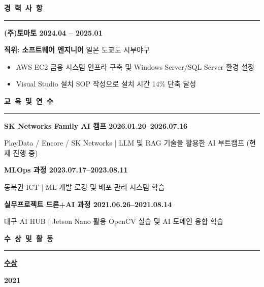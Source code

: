 \documentclass[a4paper, 10pt]{article}
\newcommand{\resumesection}[1]{%
  \vspace{8pt}
  \noindent
  {\large\bfseries #1}
  \vspace{2pt}
  \noindent\hrule
  \vspace{4pt}
}
\begin{document}

\resumesection{경\ 력\ 사\ 항}

\vspace{2pt}
\noindent
\textbf{(주)토마토 \hfill 2024.04 -- 2025.01}

\noindent
\textbf{\quad 직위: 소프트웨어 엔지니어} \hfill 일본 도쿄도 시부야구

\begin{itemize}
  \setlength{\itemsep}{1pt}
  \setlength{\parskip}{0pt}
  \item AWS EC2 금융 시스템 인프라 구축 및 Windows Server/SQL Server 환경 설정
  \item Visual Studio 설치 SOP 작성으로 설치 시간 14\% 단축 달성
\end{itemize}


\resumesection{교\ 육\ 및\ 연\ 수}

\vspace{2pt}
\noindent
\textbf{SK Networks Family AI 캠프 \hfill 2026.01.20--2026.07.16}

\noindent
{\small PlayData / Encore / SK Networks | LLM 및 RAG 기술을 활용한 AI 부트캠프 (현재 진행 중)}

\vspace{3pt}
\noindent
\textbf{MLOps 과정 \hfill 2023.07.17--2023.08.11}

\noindent
{\small 동북권 ICT | ML 개발 로깅 및 배포 관리 시스템 학습}

\vspace{3pt}
\noindent
\textbf{실무프로젝트 드론+AI 과정 \hfill 2021.06.26--2021.08.14}

\noindent
{\small 대구 AI HUB | Jetson Nano 활용 OpenCV 실습 및 AI 도메인 융합 학습}


\resumesection{수\ 상\ 및\ 활\ 동}

\vspace{2pt}
\noindent
\textbf{\underline{수상}}

\vspace{2pt}
\noindent
\textbf{2021}
\end{document}
